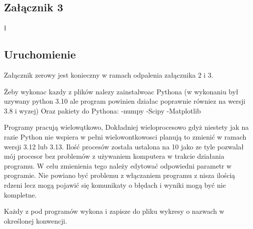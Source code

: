\documentclass{article}
\begin{document}
        \newpage
        \subsection{Załącznik 3}
        



ł
        \newpage
        \subsection{Uruchomienie}
        Załącznik zerowy jest konieczny w ramach odpalenia załącznika 2 i 3.

        Żeby wykonac kazdy z plików nalezy zainstalwoac Pythona (w wykonaniu był uzywany python 3.10 ale program powinien działac poprawnie równiez na wersji 3.8 i wyzej)
        Oraz pakiety do Pythona:
        -numpy
        -Scipy
        -Matplotlib

        Programy pracują wielowątkowo, Dokładniej wieloprocesowo gdyż niestety jak na razie Python nie wspiera w pełni wielowontkowosci planują to zmienić w ramach wersji 3.12 lub 3.13. Ilość procesów została ustalona na 10 jako ze tyle pozwalał mój procesor bez problemów z używaniem komputera w trakcie działania programu. W celu zmienienia tego należy edytować odpowiedni parametr w programie. Nie powiano być problemu z włączaniem programu z nisza ilością rdzeni lecz mogą pojawić się komunikaty o błędach i wyniki mogą być nie kompletne.

        Każdy z pod programów wykona i zapisze do pliku wykresy o nazwach w określonej konwencji.
\end{document}
